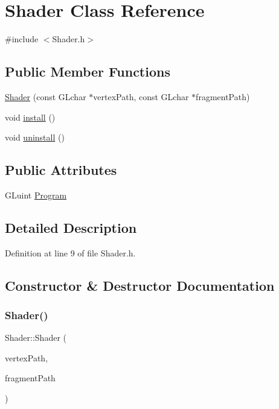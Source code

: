 \hypertarget{classShader}{}\section{Shader Class Reference}
\label{classShader}


{\ttfamily \#include $<$Shader.\+h$>$}

\subsection*{Public Member Functions}
\begin{DoxyCompactItemize}
\item 
\mbox{\hyperlink{classShader_a03421a8419cdad4b84cf58ecdb156879}{Shader}} (const G\+Lchar $\ast$vertex\+Path, const G\+Lchar $\ast$fragment\+Path)
\item 
void \mbox{\hyperlink{classShader_a8e53260be208ebf6c804a0d309e74097}{install}} ()
\item 
void \mbox{\hyperlink{classShader_afa6fb33b37c9385cf62a836092da570b}{uninstall}} ()
\end{DoxyCompactItemize}
\subsection*{Public Attributes}
\begin{DoxyCompactItemize}
\item 
G\+Luint \mbox{\hyperlink{classShader_a51b23253846bc84dcc2ef06612679012}{Program}}
\end{DoxyCompactItemize}


\subsection{Detailed Description}


Definition at line 9 of file Shader.\+h.



\subsection{Constructor \& Destructor Documentation}
\mbox{\label{classShader_a03421a8419cdad4b84cf58ecdb156879}} 
\subsubsection{\texorpdfstring{Shader()}{Shader()}}
{\footnotesize\ttfamily Shader\+::\+Shader (\begin{DoxyParamCaption}\item[{const G\+Lchar $\ast$}]{vertex\+Path,  }\item[{const G\+Lchar $\ast$}]{fragment\+Path }\end{DoxyParamCaption})}



